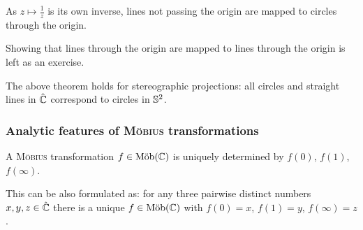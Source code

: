 \documentclass[a4paper,english]{article}
\begin{document}
\begin{pr}
    As $z \mapsto \frac{1}{z}$ is its own inverse, lines not passing the origin are mapped to circles through the origin.
    
    Showing that lines through the origin are mapped to lines through the origin is left as an exercise.
\end{pr}

\begin{remark}
    The above theorem holds for stereographic projections: all circles and straight lines in $\hat{\CC}$ correspond to circles in $\S^2$.
\end{remark}

\subsubsection{Analytic features of \textsc{Möbius} transformations}

\begin{lemma}
    A \textsc{Möbius} transformation $f \in \Moeb(\CC)$ is uniquely determined by $f(0)$, $f(1)$, $f(\infty)$.
\end{lemma}
This can be also formulated as: for any three pairwise distinct numbers $x,y,z \in \hat{\CC}$ there is a unique $f \in \Moeb(\CC)$ with $f(0) = x$, $f(1) = y$, $f(\infty) = z$.
\end{document}

